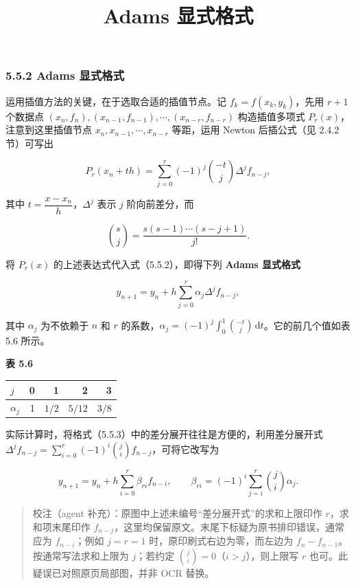 \documentclass[
  10pt,
  fontset=fandol]{ctexart}
\title{Adams 显式格式}
\author{}
\date{}
\newcounter{none} %
\begin{document}
\maketitle

\subsubsection{5.5.2 Adams 显式格式}\label{adams-ux663eux5f0fux683cux5f0f}

运用插值方法的关键，在于选取合适的插值节点。记 \(f_k=f(x_k,y_k)\)，先用 \(r+1\) 个数据点 \((x_n,\allowbreak f_n),\allowbreak (x_{n-1},\allowbreak f_{n-1}),\allowbreak \cdots,\allowbreak (x_{n-r},\allowbreak f_{n-r})\) 构造插值多项式 \(P_r(x)\)，注意到这里插值节点 \(x_n,x_{n-1},\cdots,x_{n-r}\) 等距，运用 Newton 后插公式（见 2.4.2 节）可写出

\[
P_r(x_n+th)=\sum_{j=0}^r(-1)^j\binom{-t}{j}\Delta^j f_{n-j},
\]

其中 \(t=\dfrac{x-x_n}{h}\)，\(\Delta^j\) 表示 \(j\) 阶向前差分，而

\[
\binom sj=\frac{s(s-1)\cdots(s-j+1)}{j!}.
\]

将 \(P_r(x)\) 的上述表达式代入式（5.5.2），即得下列 \textbf{Adams 显式格式}

\[
y_{n+1}=y_n+h\sum_{j=0}^r\alpha_j\Delta^j f_{n-j},
\tag{5.5.3}
\]

其中 \(\alpha_j\) 为不依赖于 \(n\) 和 \(r\) 的系数，\(\alpha_j=(-1)^j\int_0^1\binom{-t}{j}\,\mathrm dt\)。它的前几个值如表 5.6 所示。

\textbf{表 5.6}

{\def\LTcaptype{none} %
\begin{longtable}[]{@{}lrrrr@{}}
\toprule\noalign{}
\(j\) & 0 & 1 & 2 & 3 \\
\midrule\noalign{}
\endhead
\bottomrule\noalign{}
\endlastfoot
\(\alpha_j\) & 1 & \(1/2\) & \(5/12\) & \(3/8\) \\
\end{longtable}
}

实际计算时，将格式（5.5.3）中的差分展开往往是方便的，利用差分展开式 \(\Delta^j f_{n-j}=\sum_{i=0}^r(-1)^i\binom ji f_{n-j}\)，可将它改写为

\[
y_{n+1}=y_n+h\sum_{i=0}^r\beta_{ri}f_{n-i},\qquad
\beta_{ri}=(-1)^i\sum_{j=i}^r\binom ji\alpha_j.
\tag{5.5.4}
\]

\begin{quote}
校注（agent 补充）：原图中上述未编号``差分展开式''的求和上限印作 \(r\)，求和项末尾印作 \(f_{n-j}\)，这里均保留原文。末尾下标疑为原书排印错误，通常应为 \(f_{n-i}\)；例如 \(j=r=1\) 时，原印刷式右边为零，而左边为 \(f_n-f_{n-1}\)。按通常写法求和上限为 \(j\)；若约定 \(\binom ji=0\)（\(i>j\)），则上限写 \(r\) 也可。此疑误已对照原页局部图，并非 OCR 替换。
\end{quote}
\end{document}
